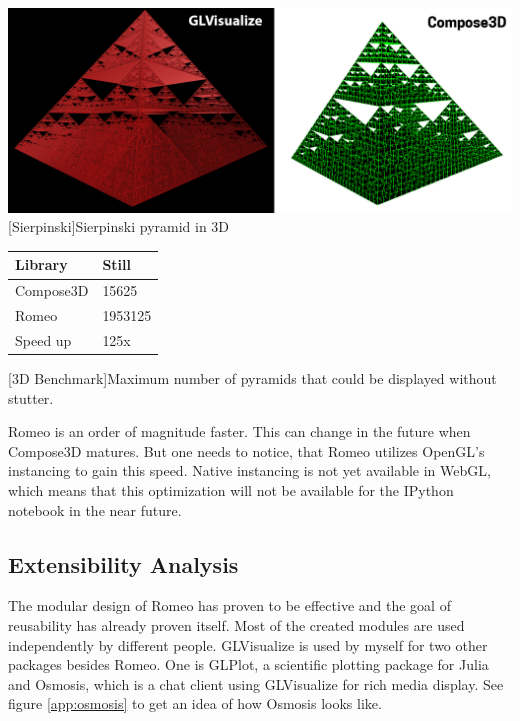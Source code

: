 \begin{minipage}{\linewidth}
    \centering
    \includegraphics[width=\linewidth]{graphics/sierpinsky.jpg}
    [Sierpinski]{Sierpinski pyramid in 3D}
    \label{fig:reactive1}
\end{minipage}
\begin{table}[htbp]
    \centering
    \begin{tabular}{l|l}
        \hline
        \textbf{Library} & \textbf{Still}\\ 
        \hline
        Compose3D        & 15625         \\
        Romeo            & 1953125       \\
        \hline
        \hline
        Speed up         & 125x          \\
    \end{tabular}
    [3D Benchmark]{Maximum number of pyramids that could be displayed without stutter.}
    \label{table:relativespeedoglw}
\end{table}

Romeo is an order of magnitude faster. This can change in the future when Compose3D matures.
But one needs to notice, that Romeo utilizes OpenGL's instancing to gain this speed. Native instancing is not yet available in WebGL, which means that this optimization will not be available for the IPython notebook in the near future.

\subsection{Extensibility Analysis}

The modular design of Romeo has proven to be effective and the goal of reusability has already proven itself.
Most of the created modules are used independently by different people.
GLVisualize is used by myself for two other packages besides Romeo. One is GLPlot\cite{GLPlot}, a scientific plotting package for Julia and Osmosis\cite{Osmosis}, which is a chat client using GLVisualize for rich media display.
See figure \ref{app:osmosis} to get an idea of how Osmosis looks like.

